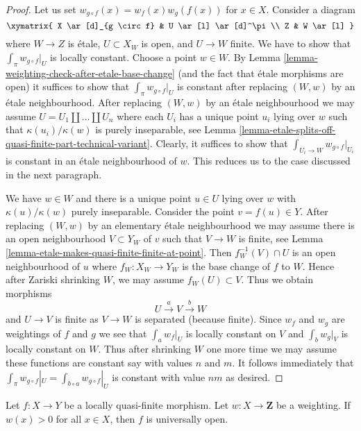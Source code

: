 \begin{proof}
Let us set $w_{g \circ f}(x) = w_f(x) w_g(f(x))$ for $x \in X$.
Consider a diagram
$$
\xymatrix{
X \ar[d]_{g \circ f} & U \ar[l] \ar[d]^\pi \\
Z & W \ar[l]
}
$$
where $W \to Z$ is \'etale, $U \subset X_W$ is open, and $U \to W$ finite.
We have to show that $\int_\pi w_{g \circ f}|_U$ is locally constant.
Choose a point $w \in W$. By
Lemma \ref{lemma-weighting-check-after-etale-base-change}
(and the fact that \'etale morphisms are open) it suffices to show that
$\int_\pi w_{g \circ f}|_U$ is constant after replacing
$(W, w)$ by an \'etale neighbourhood.
After replacing $(W, w)$ by an \'etale neighbourhood we may
assume $U = U_1 \amalg \ldots \amalg U_n$ where each $U_i$
has a unique point $u_i$ lying over $w$ such that
$\kappa(u_i)/\kappa(w)$ is purely inseparable, see
Lemma \ref{lemma-etale-splits-off-quasi-finite-part-technical-variant}.
Clearly, it suffices to show that $\int_{U_i \to W} w_{g \circ f}|_{U_i}$
is constant in an \'etale neighbourhood of $w$.
This reduces us to the case discussed in the next paragraph.

\medskip\noindent
We have $w \in W$ and there is a unique point $u \in U$ lying
over $w$ with $\kappa(u)/\kappa(w)$ purely inseparable.
Consider the point $v = f(u) \in Y$. After replacing
$(W, w)$ by an elementary \'etale neighbourhood we may
assume there is an open neighbourhood $V \subset Y_W$
of $v$ such that $V \to W$ is finite, see
Lemma \ref{lemma-etale-makes-quasi-finite-finite-at-point}.
Then $f_W^{-1}(V) \cap U$ is an open neighbourhood of $u$
where $f_W : X_W \to Y_W$ is the base change of $f$ to $W$.
Hence after Zariski shrinking $W$, we may assume $f_W(U) \subset V$.
Thus we obtain morphisms
$$
U \xrightarrow{a} V \xrightarrow{b} W
$$
and $U \to V$ is finite as $V \to W$ is separated (because finite).
Since $w_f$ and $w_g$ are weightings of $f$ and $g$
we see that $\int_a w_f|_U$ is locally constant on $V$ and
$\int_b w_g|_V$ is locally constant on $W$. Thus after shrinking
$W$ one more time we may assume these functions are constant
say with values $n$ and $m$. It follows immediately that
$\int_\pi w_{g \circ f}|_U = \int_{b \circ a} w_{g \circ f}|_U$
is constant with value $nm$ as desired.
\end{proof}

\begin{lemma}
\label{lemma-weighting-universally-open}
Let $f : X \to Y$ be a locally quasi-finite morphism.
Let $w : X \to \mathbf{Z}$ be a weighting. If $w(x) > 0$
for all $x \in X$, then $f$ is universally open.
\end{lemma}


